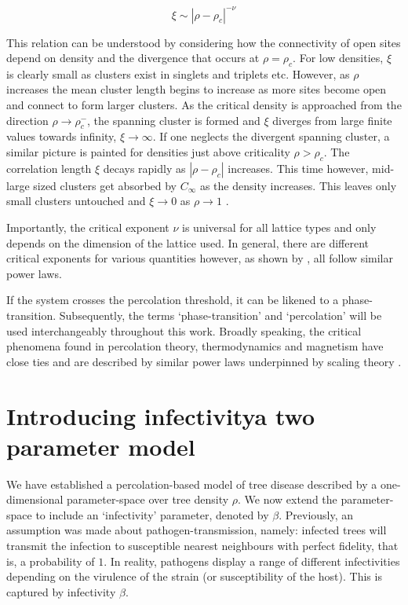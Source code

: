\begin{equation*}
    \xi \sim |\rho - \rho_c|^{-\nu}
\end{equation*}

This relation can be understood by considering how the connectivity of open sites depend on density and the divergence that occurs at $\rho=\rho_c$. %
For low densities, $\xi$ is clearly small as clusters exist in singlets and triplets etc. %
However, as $\rho$ increases the mean cluster length begins to increase as more sites become open and connect to form larger clusters. %
As the critical density is approached from the direction $\rho \rightarrow \rho_c^{-}$, the spanning cluster is formed and $\xi$ diverges from large finite values towards infinity, $\xi \rightarrow \infty$. %
If one neglects the divergent spanning cluster, a similar picture is painted for densities just above criticality $\rho > \rho_c$. %
The correlation length $\xi$ decays rapidly as $|\rho - \rho_c|$ increases. %
This time however,  mid-large sized clusters get absorbed by $C_\infty$ as the density increases. %
This leaves only small clusters untouched and $\xi \rightarrow 0 $ as $\rho \rightarrow 1$ \cite[see][for a detailed break-down of power laws and correlation length.]{STAUFFER19791}. %

Importantly, the critical exponent $\nu$ is universal for all lattice types and only depends on the dimension of the lattice used. In general, there are different critical exponents for various quantities however, as shown by \cite{stauffer2018introduction, STAUFFER19791}, all follow similar power laws. 

If the system crosses the percolation threshold, it can be likened to a phase-transition. %
Subsequently, the terms `phase-transition' and `percolation' will be used interchangeably throughout this work. %
Broadly speaking, the critical phenomena found in percolation theory, thermodynamics and magnetism have close ties and are described by similar power laws underpinned by scaling theory \citep{Essam_1980}. %

\section{Introducing infectivity\textemdash a two parameter model}
\label{ch3:two-param-model}

We have established a percolation-based model of tree disease described by a one-dimensional parameter-space over tree density $\rho$. %
We now extend the parameter-space to include an `infectivity' parameter, denoted by $\beta$. %
Previously, an assumption was made about pathogen-transmission, namely: %
infected trees will transmit the infection to susceptible nearest neighbours with perfect fidelity, %
that is, a probability of $1$. In reality, pathogens display a range of different infectivities depending on the virulence of the strain (or susceptibility of the host). %
This is captured by infectivity $\beta$. 

